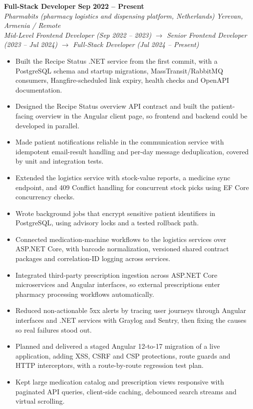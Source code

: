 \documentclass[a4paper,10pt]{article}
\newcommand{\jobheader}[4]{%
  \textbf{#1} \hfill \textbf{#2} \\%
  \textit{\color{primarycolor}#3} \hfill \textit{#4}\\%
}
\newenvironment{tightitems}{\begin{itemize}[leftmargin=12pt, itemsep=1pt, parsep=0pt, topsep=2pt]}{\end{itemize}}
\begin{document}
\jobheader{Full-Stack Developer}{Sep 2022 -- Present}{Pharmabits (pharmacy logistics and dispensing platform, Netherlands)}{Yerevan, Armenia / Remote}
{\small\textit{Mid-Level Frontend Developer (Sep 2022 -- 2023) $\rightarrow$ Senior Frontend Developer (2023 -- Jul 2024) $\rightarrow$ Full-Stack Developer (Jul 2024 -- Present)}}
\begin{tightitems}
    \item Built the Recipe Status .NET service from the first commit, with a PostgreSQL schema and startup migrations, MassTransit/RabbitMQ consumers, Hangfire-scheduled link expiry, health checks and OpenAPI documentation.
    \item Designed the Recipe Status overview API contract and built the patient-facing overview in the Angular client page, so frontend and backend could be developed in parallel.
    \item Made patient notifications reliable in the communication service with idempotent email-result handling and per-day message deduplication, covered by unit and integration tests.
    \item Extended the logistics service with stock-value reports, a medicine sync endpoint, and 409 Conflict handling for concurrent stock picks using EF Core concurrency checks.
    \item Wrote background jobs that encrypt sensitive patient identifiers in PostgreSQL, using advisory locks and a tested rollback path.
    \item Connected medication-machine workflows to the logistics services over ASP.NET Core, with barcode normalization, versioned shared contract packages and correlation-ID logging across services.
    \item Integrated third-party prescription ingestion across ASP.NET Core microservices and Angular interfaces, so external prescriptions enter pharmacy processing workflows automatically.
    \item Reduced non-actionable 5xx alerts by tracing user journeys through Angular interfaces and .NET services with Graylog and Sentry, then fixing the causes so real failures stood out.
    \item Planned and delivered a staged Angular 12-to-17 migration of a live application, adding XSS, CSRF and CSP protections, route guards and HTTP interceptors, with a route-by-route regression test plan.
    \item Kept large medication catalog and prescription views responsive with paginated API queries, client-side caching, debounced search streams and virtual scrolling.

\end{tightitems}
\end{document}
